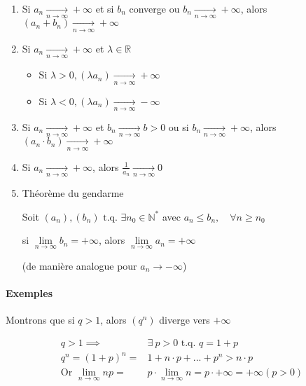 \documentclass[
    11pt,
    a4paper,
    oneside,
    headinlcude, footinclude,
    twoside,
]{report}
\newcommand{\tq}[0]{\textrm{ t.q. }}
\begin{document}
\begin{enumerate}
\item Si $a_{n} \xrightarrow[n \to \infty]{} + \infty$ et si $b_{n}$
converge ou $b_{n} \xrightarrow[n \to \infty]{} + \infty$, alors $(a_{n} +
b_{n}) \xrightarrow[n \to \infty]{} + \infty$

\item Si $a_{n} \xrightarrow[n \to \infty]{} + \infty$ et $\lambda \in \mathbb{R}$

\begin{itemize}
\item Si $\lambda > 0, (\lambda a_{n}) \xrightarrow[n \to \infty]{} + \infty$
\item Si $\lambda < 0, (\lambda a_{n}) \xrightarrow[n \to \infty]{} - \infty$
\end{itemize}

\item Si $a_{n} \xrightarrow[n \to \infty]{} + \infty$ et $b_{n}
\xrightarrow[n \to \infty]{} b > 0$ ou si $b_{n} \xrightarrow[n \to
\infty]{} + \infty$, alors $(a_{n}\cdot b_{n}) \xrightarrow[n \to
\infty]{} + \infty$

\item Si $a_{n} \xrightarrow[n \to \infty]{} + \infty$, alors $\frac{1}{a_{n}}
\xrightarrow[n \to \infty]{} 0$

\item Théorème du gendarme

Soit $(a_{n}), (b_{n}) \tq \exists n_{0} \in \mathbb{N}^{*}$ avec $a_{n}
\leq b_{n}, \quad \forall n \geq n_{0}$

si $\lim\limits_{n \to \infty} b_{n} = + \infty$, alors $\lim\limits_{n \to \infty} a_{n} = + \infty$

(de manière analogue pour $a_{n} \to - \infty$)
\end{enumerate}

\paragraph{Exemples}
\label{par:exemples}

Montrons que si $q > 1$, alors $(q^{n})$ diverge vers $+ \infty$

\[
\begin{split}
q > 1 \implies& \exists \ p > 0 \tq q = 1 + p\\
q^{n} = (1+p)^{n} =& 1 + n \cdot p + ... + p^{n} > n \cdot p\\
\textrm{Or }  \lim_{n \to \infty} np =&  p \cdot \lim_{n \to \infty} n
= p \cdot + \infty = + \infty (p > 0)
\end{split}
\]
\end{document}
